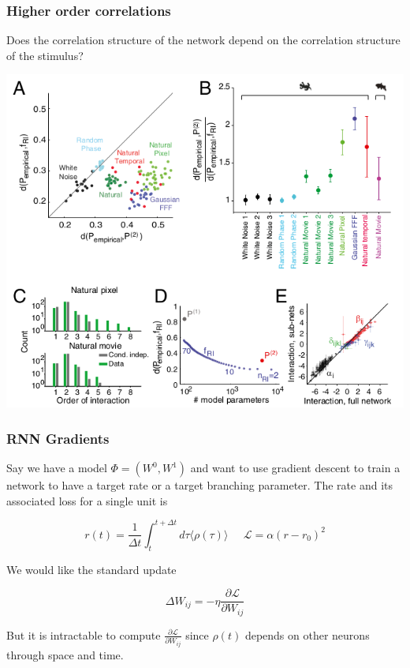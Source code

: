 \documentclass{beamer}
\begin{document}
\begin{frame}[plain]
\frametitle{Higher order correlations} 

Does the correlation structure of the network depend on the correlation structure of the stimulus?

\begin{center}
\includegraphics[scale=0.35]{higher-order-interactions}
\end{center}

\end{frame}


\begin{frame}[plain]
\frametitle{RNN Gradients} 

Say we have a model $\Phi = (W^{0},W^{1})$ and want to use gradient descent to train a network to have a target rate or a target branching parameter. The rate and its associated loss for a single unit is

\begin{equation*}
r(t) = \frac{1}{\Delta t}\int_{t}^{t+\Delta t} d\tau \langle \rho(\tau)\rangle\;\;\;\;\;\mathcal{L} = \alpha(r-r_{0})^{2}
\end{equation*}

We would like the standard update 

\begin{equation*}
\Delta W_{ij} = -\eta \frac{\partial\mathcal{L}}{\partial W_{ij}}
\end{equation*}


But it is intractable to compute $\frac{\partial\mathcal{L}}{\partial W_{ij}}$ since $\rho(t)$ depends on other neurons through space and time.


\end{frame}
\end{document}
